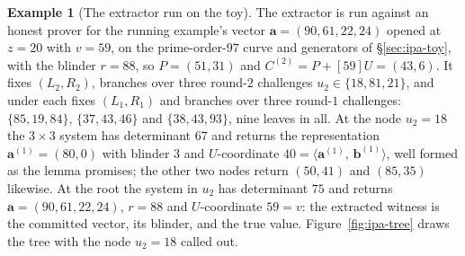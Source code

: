 \documentclass[11pt,a4paper]{article}
\theoremstyle{definition}
\newtheorem{example}[theorem]{Example}
\newcommand{\ip}[2]{\langle #1,\, #2 \rangle}
\begin{document}
\begin{example}[The extractor run on the toy]
\label{ex:ipa-extract}
The extractor is run against an honest prover for the running example's
vector $\mathbf a = (90, 61, 22, 24)$ opened at $z = 20$ with $v = 59$,
on the prime-order-$97$ curve and generators of \S\ref{sec:ipa-toy},
with the blinder $r = 88$, so $P = (51, 31)$ and
$C^{(2)} = P + [59]U = (43, 6)$. It fixes
$(L_2, R_2)$, branches over three round-$2$ challenges
$u_2 \in \{18, 81, 21\}$, and under each fixes $(L_1, R_1)$ and
branches over three round-$1$ challenges: $\{85, 19, 84\}$,
$\{37, 43, 46\}$ and $\{38, 43, 93\}$, nine leaves in all. At the node
$u_2 = 18$ the $3 \times 3$ system has determinant $67$ and returns the
representation $\mathbf a^{(1)} = (80, 0)$ with blinder $3$ and
$U$-coordinate $40 = \ip{\mathbf a^{(1)}}{\mathbf b^{(1)}}$, well
formed as the lemma promises; the other two nodes return $(50, 41)$
and $(85, 35)$ likewise. At the root the system in $u_2$ has
determinant $75$ and returns $\mathbf a = (90, 61, 22, 24)$, $r = 88$
and $U$-coordinate $59 = v$: the extracted witness is the committed
vector, its blinder, and the true value.
Figure~\ref{fig:ipa-tree} draws the tree with the node
$u_2 = 18$ called out.
\end{example}
\end{document}
